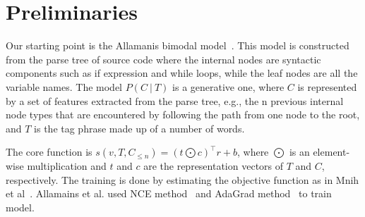 \section{Preliminaries}
Our starting point is the Allamanis bimodal model~\cite{allamanis2015bimodal}. This model is constructed
from the parse tree of source code where the internal nodes are
syntactic components such as if expression and while loops,
while the leaf nodes are all the variable names.
The model $P (C~ |~ T)$ is a generative one,
where $C$ is represented by a set of features extracted
from the parse tree, e.g., the n previous internal node types that are encountered by following the path from one node to the root,
and $T$ is the tag phrase made up of a number of words.

The core function is $s(v,T,C_{\leq n}) = (t \bigodot c)^{\top} r + b$, where
$\bigodot$ is an element-wise multiplication and $t$ and $c$ are
the representation vectors of $T$ and $C$, respectively.
The training is done by estimating the objective function as in
Mnih et al~\cite{mnih2013learning}. Allamains et al. used NCE method~\cite{gutmann2012noise} and AdaGrad method~\cite{duchi2011adaptive} to train model.

